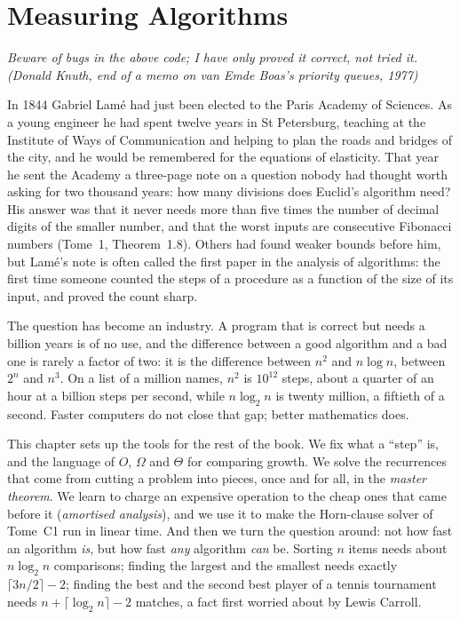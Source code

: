 \chapter{Measuring Algorithms}\label{ch:measuring}

\begin{center}\itshape
Beware of bugs in the above code; I have only proved it correct, not tried it.\\
\upshape(Donald Knuth, end of a memo on van Emde Boas's priority queues, 1977)
\end{center}

In 1844 Gabriel Lam\'e had just been elected to the Paris Academy of Sciences. As a young engineer he had spent twelve years in
St Petersburg, teaching at the Institute of Ways of Communication and helping to plan the roads and bridges of the city, and he would
be remembered for the equations of elasticity. That year he sent the Academy a three-page note on a question nobody had thought worth asking for two thousand years: how many
divisions does Euclid's algorithm need? His answer was that it never needs more than five times the number of decimal digits of the
smaller number, and that the worst inputs are consecutive Fibonacci numbers (Tome~1, Theorem~1.8). Others had found weaker
bounds before him, but Lam\'e's note is often called the first paper in the analysis of algorithms: the first time someone counted
the steps of a procedure as a function of the size of its input, and proved the count sharp.

The question has become an industry. A program that is correct but needs a billion years is of no use, and the difference between a
good algorithm and a bad one is rarely a factor of two: it is the difference between $n^2$ and $n\log n$, between $2^n$ and $n^3$. On a
list of a million names, $n^2$ is $10^{12}$ steps, about a quarter of an hour at a billion steps per second, while $n\log_2 n$ is twenty
million, a fiftieth of a second. Faster computers do not close that gap; better mathematics does.

This chapter sets up the tools for the rest of the book. We fix what a ``step'' is, and the language of $O$, $\Omega$ and $\Theta$ for
comparing growth. We solve the recurrences that come from cutting a problem into pieces, once and for all, in the \emph{master theorem}.
We learn to charge an expensive operation to the cheap ones that came before it (\emph{amortised analysis}), and we use it to make
the Horn-clause solver of Tome~C1 run in linear time. And then we turn the question around: not how fast an algorithm \emph{is}, but how
fast \emph{any} algorithm \emph{can} be. Sorting $n$ items needs about $n\log_2 n$ comparisons; finding the largest and the smallest
needs exactly $\lceil 3n/2\rceil-2$; finding the best and the second best player of a tennis tournament needs
$n+\lceil\log_2 n\rceil-2$ matches, a fact first worried about by Lewis Carroll.

